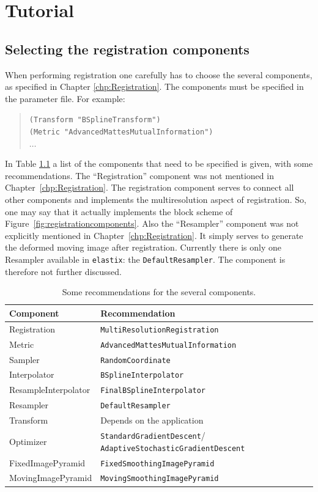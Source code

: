 \documentclass[]{report}
\newcommand{\elastix}{\texttt{elastix}}
\begin{document}
\chapter{Tutorial}\label{chp:Tutorial}


\section{Selecting the registration components}

When performing registration one carefully has to choose the
several components, as specified in Chapter
\ref{chp:Registration}. The components must be specified in the
parameter file. For example:
\begin{quote}
\texttt{(Transform "BSplineTransform")}\\
\texttt{(Metric "AdvancedMattesMutualInformation")}\\
$\ldots$
\end{quote}

In Table \ref{table:tutorial:components} a list of the components
that need to be specified is given, with some recommendations. The
``Registration'' component was not mentioned in
Chapter~\ref{chp:Registration}. The registration component serves
to connect all other components and implements the multiresolution
aspect of registration. So, one may say that it actually
implements the block scheme of
Figure~\ref{fig:registrationcomponents}. Also the ``Resampler''
component was not explicitly mentioned in
Chapter~\ref{chp:Registration}. It simply serves to generate the
deformed moving image after registration. Currently there is only
one Resampler available in \elastix: the
\texttt{DefaultResampler}. The component is therefore not further
discussed.

\begin{table}[htb]
\centering
\begin{tabular}{l|p{15em}}
\textbf{Component} & \textbf{Recommendation} \\
\hline
Registration & \texttt{MultiResolutionRegistration} \\
Metric       & \texttt{AdvancedMattesMutualInformation} \\
Sampler      & \texttt{RandomCoordinate} \\
Interpolator & \texttt{BSplineInterpolator} \\
ResampleInterpolator & \texttt{FinalBSplineInterpolator} \\
Resampler    & \texttt{DefaultResampler}\\
Transform    & Depends on the application \\
Optimizer    & \texttt{StandardGradientDescent}/ \texttt{AdaptiveStochasticGradientDescent} \\
FixedImagePyramid   & \texttt{FixedSmoothingImagePyramid} \\
MovingImagePyramid  & \texttt{MovingSmoothingImagePyramid} \\
\end{tabular}
\caption{Some recommendations for the several components.}\label{table:tutorial:components}
\end{table}
\end{document}
